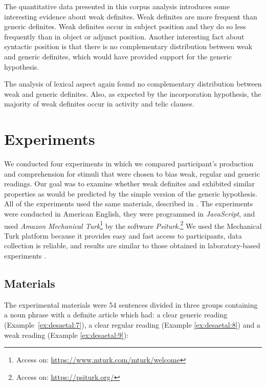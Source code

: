\documentclass[output=paper,
modfonts
]{langscibook}
\begin{document}
The quantitative data presented in this corpus analysis introduces some interesting evidence about weak definites. Weak definites are more frequent than generic definites. Weak definites occur in subject position and they do so less frequently than in object or adjunct position. Another interesting fact about syntactic position is that there is no complementary distribution between weak and generic definites, which would have provided support for the generic hypothesis. 

The analysis of lexical aspect again found no complementary distribution between weak and generic definites. Also, as expected by the incorporation hypothesis, the majority of weak definites occur in activity and telic clauses. 
 
\section{Experiments} \label{sec:desaetal:4}

We conducted four experiments in which we compared participant’s production and comprehension for stimuli that were chosen to bias weak, regular and generic readings. Our goal was to examine whether weak definites and  exhibited similar properties as would be predicted by the simple version of the generic hypothesis.  All of the experiments used the same materials, described in . The experiments were conducted in American English, they were programmed in \textit{JavaScript}, and used \textit{Amazon Mechanical Turk}\footnote{Access on: \url{https://www.mturk.com/mturk/welcome}} by the software \textit{Psiturk}.\footnote{Access on: \url{https://psiturk.org/}}  We used the Mechanical Turk platform because it provides easy and fast access to participants, data collection is reliable, and results are similar to those obtained in laboratory-based experiments \citep[cf.][]{MasonSuri2012,PaolacciEtAlii2010}.


\subsection{Materials} \label{sec:desaetal:4.1}

The experimental materials were 54 sentences divided in three groups containing a noun phrase with a definite article which had: a clear generic reading (Example~\ref{ex:desaetal:7}), a clear regular reading (Example \ref{ex:desaetal:8}) and a weak reading (Example \ref{ex:desaetal:9}):
\end{document}
